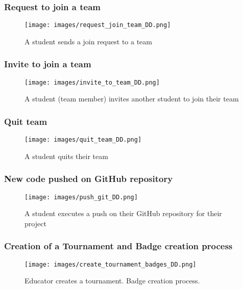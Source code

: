 \documentclass[a4paper, 11pt, titlepage]{article}
\begin{document}
\subsubsection*{Request to join a team}
\begin{figure}[H]
  \centering
  \texttt{[image: images/request\_join\_team\_DD.png]}
  \caption{A student sends a join request to a team}
  \label{fig:seq_diag_req_join_team}
\end{figure}

\subsubsection*{Invite to join a team}
\begin{figure}[H]
  \centering
  \texttt{[image: images/invite\_to\_team\_DD.png]}
  \caption{A student (team member) invites another student to join their team}
  \label{fig:seq_diag_invite_join_team}
\end{figure}

\subsubsection*{Quit team}
\begin{figure}[H]
  \centering
  \texttt{[image: images/quit\_team\_DD.png]}
  \caption{A student quits their team}
  \label{fig:seq_diag_quit_team}
\end{figure}

\subsubsection*{New code pushed on GitHub repository}
\begin{figure}[H]
  \centering
  \texttt{[image: images/push\_git\_DD.png]}
  \caption{A student executes a push on their GitHub repository for their project}
  \label{fig:seq_diag_Git_push}
\end{figure}

\subsubsection*{Creation of a Tournament and Badge creation process}
\begin{figure}[H]
  \centering
  \texttt{[image: images/create\_tournament\_badges\_DD.png]}
  \caption{Educator creates a tournament. Badge creation process.}
  \label{fig:seq_diag_create_tourn}
\end{figure}
\end{document}
